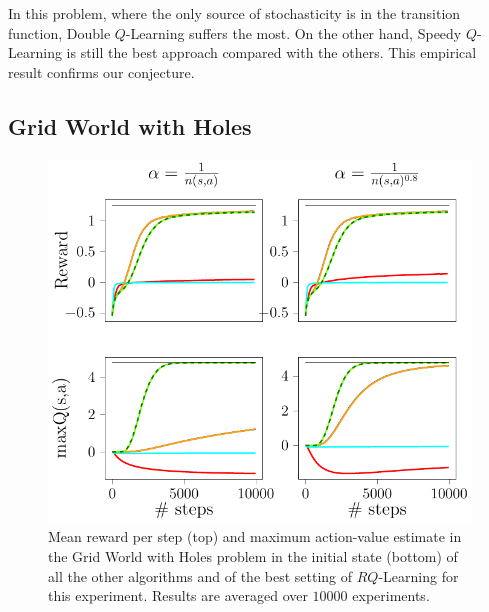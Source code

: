 In this problem, where the only source of stochasticity is in the transition function, Double $Q$-Learning suffers the most. On the other hand, Speedy $Q$-Learning is still the best approach compared with the others. This empirical result confirms our conjecture.
\subsection{Grid World with Holes}
\begin{figure}[t]
\begin{minipage}{\columnwidth}
\centering
  \includegraphics[scale=.7]{./img/grid_hole.pdf}
\end{minipage}
  \caption[Grid world with holes algorithms comparison - 1]{Mean reward per step (top) and maximum action-value estimate in the Grid World with Holes problem in the initial state (bottom) of all the other algorithms and of the best setting of $RQ$-Learning for this experiment. Results are averaged over $10000$ experiments.}
  \label{F:hole}
\end{figure}


